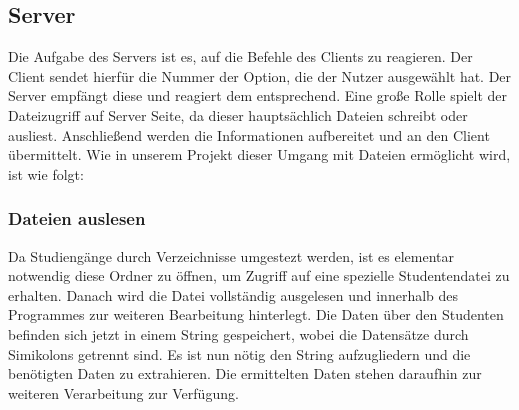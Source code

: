 \documentclass{scrartcl}
\begin{document}
	\subsection{Server}
		Die Aufgabe des Servers ist es, auf die Befehle des Clients zu reagieren. Der Client sendet hierfür die Nummer der Option, die der Nutzer ausgewählt hat. Der Server empfängt diese und reagiert dem entsprechend. Eine große Rolle spielt der Dateizugriff auf Server Seite, da dieser hauptsächlich Dateien schreibt oder ausliest. Anschließend werden die Informationen aufbereitet und an den Client übermittelt. Wie in unserem Projekt dieser Umgang mit Dateien ermöglicht wird, ist wie folgt:
		\subsubsection{Dateien auslesen}
			Da Studiengänge durch Verzeichnisse umgestezt werden, ist es elementar notwendig diese Ordner zu öffnen, um Zugriff auf eine spezielle Studentendatei zu erhalten. Danach wird die Datei vollständig ausgelesen und innerhalb des Programmes zur weiteren Bearbeitung hinterlegt. Die Daten über den Studenten befinden sich jetzt in einem String gespeichert, wobei die Datensätze durch Simikolons getrennt sind. Es ist nun nötig den String aufzugliedern und die benötigten Daten zu extrahieren. Die ermittelten Daten stehen daraufhin zur weiteren Verarbeitung zur Verfügung.
\end{document}
